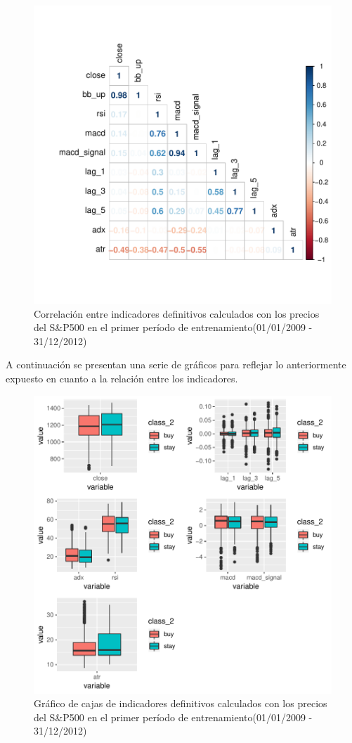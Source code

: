 \documentclass[a4paper,12pt]{Latex/Classes/PhDthesisPSnPDF}
\begin{document}
\begin{figure}[H]
\centering
\includegraphics{main-007}
\caption{Correlación entre indicadores definitivos calculados con los precios del S\&P500 en el primer período de entrenamiento(01/01/2009 - 31/12/2012)}
\end{figure}

A continuación se presentan una serie de gráficos para reflejar lo anteriormente expuesto en cuanto a la relación entre los indicadores.


\begin{figure}[H]
\centering
\includegraphics{main-009}
\caption{Gráfico de cajas de indicadores definitivos calculados con los precios del S\&P500 en el primer período de entrenamiento(01/01/2009 - 31/12/2012)}
\end{figure}
\end{document}
